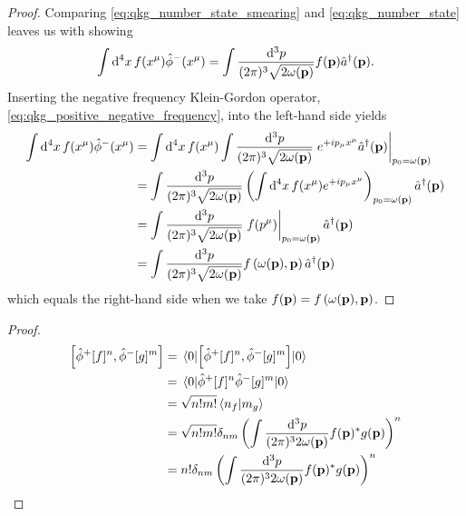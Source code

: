 \qkgnumbersmearing
\begin{proof}
	Comparing \cref{eq:qkg_number_state_smearing} and \cref{eq:qkg_number_state} leaves us with showing
	\begin{equation*}
		\int\dd[4]{x}
		f(x^\mu)
		\hat\phi^-(x^\mu)
		=
		\int\frac{\dd[3]{p}}{(2\pi)^3\sqrt{2\omega(\vb{p})}}
		f(\vb{p})
		\hat{a}^\dagger(\vb{p})
		.
	\end{equation*}
	Inserting the negative frequency Klein-Gordon operator, \cref{eq:qkg_positive_negative_frequency}, into the left-hand side yields
	\begin{equation*}
		\begin{split}
			\int\dd[4]{x}
			f(x^\mu)
			\hat\phi^-(x^\mu)
			&=
			\int\dd[4]{x}
			f(x^\mu)
			\int\frac{\dd[3]{p}}{(2\pi)^3\sqrt{2\omega(\vb{p})}}
			\eval{
				e^{+ip_\mu x^\mu}
				\hat{a}^\dagger(\vb{p})
			}_{p_0=\omega(\vb{p})}
			\\
			&=
			\int\frac{\dd[3]{p}}{(2\pi)^3\sqrt{2\omega(\vb{p})}}
			\left(
				\int\dd[4]{x}
				f(x^\mu)
				e^{+ip_\mu x^\mu}
			\right)_{p_0=\omega(\vb{p})}
			\hat{a}^\dagger(\vb{p})
			\\
			&=
			\int\frac{\dd[3]{p}}{(2\pi)^3\sqrt{2\omega(\vb{p})}}
			\eval{f(p^\mu)}_{p_0=\omega(\vb{p})}
			\hat{a}^\dagger(\vb{p})
			\\
			&=
			\int\frac{\dd[3]{p}}{(2\pi)^3\sqrt{2\omega(\vb{p})}}
			f\left(\omega(\vb{p}),\vb{p}\right)
			\hat{a}^\dagger(\vb{p})
		\end{split}
	\end{equation*}
	which equals the right-hand side when we take $f(\vb{p})=f\left(\omega(\vb{p}),\vb{p}\right)$.
\end{proof}

\qkgnumbercommpn
\begin{proof}
	\begin{equation*}
		\begin{split}
			\comm{\hat\phi^+[f]^n}{\hat\phi^-[g]^m}
			&=
			\expval{\comm{\hat\phi^+[f]^n}{\hat\phi^-[g]^m}}{0}
			\\
			&=
			\expval{\hat\phi^+[f]^n\hat\phi^-[g]^m}{0}
			\\
			&=
			\sqrt{n!m!}
			\braket{n_f}{m_g}
			\\
			&=
			\sqrt{n!m!}
			\delta_{nm}
			\left(
				\int\frac{\dd[3]{p}}{(2\pi)^32\omega(\vb{p})}
				f(\vb{p})^*
				g(\vb{p})
			\right)^n
			\\
			&=
			n!
			\delta_{nm}
			\left(
				\int\frac{\dd[3]{p}}{(2\pi)^32\omega(\vb{p})}
				f(\vb{p})^*
				g(\vb{p})
			\right)^n
		\end{split}
	\end{equation*}
\end{proof}

